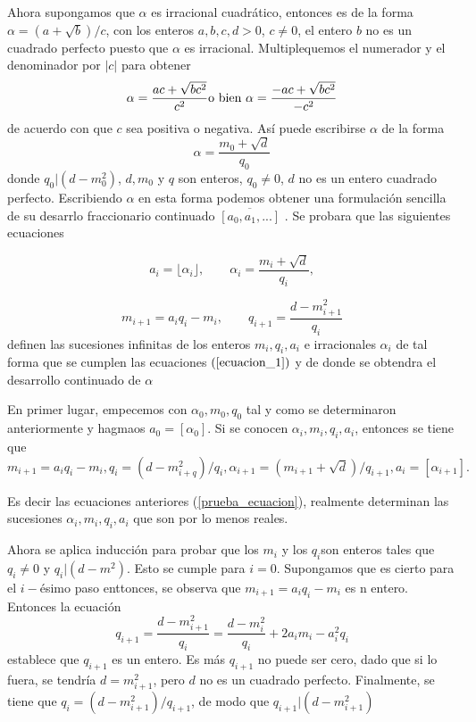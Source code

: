 \documentclass[11pt, article]{article}
\begin{document}
    Ahora supongamos que $\alpha$ es irracional cuadrático, entonces es de la forma $\alpha=(a+\sqrt{b})/c$, con los enteros $a,b,c,d>0$, $c\not=0$, el entero $b$ no es un cuadrado perfecto puesto que $\alpha$ es irracional. Multiplequemos el numerador y el denominador por $|c|$ para obtener 
        \[
        \alpha = \dfrac{ac + \sqrt{bc^2}}{c^2} \textnormal{o bien } \alpha=\dfrac{-ac+\sqrt{bc^2}}{-c^2}
        \]
    de acuerdo con que $c$ sea positiva o negativa. Así puede escribirse $\alpha$ de la forma
        \[
        \alpha = \dfrac{m_0+\sqrt{d}}{q_0}
        \]
    donde $q_0|(d-m_0^2)$, $d,m_0$ y $q$ son enteros, $q_0\not=0$, $d$ no es un entero cuadrado perfecto. Escribiendo $\alpha$ en esta forma podemos obtener una formulación sencilla de su desarrlo fraccionario continuado $\overline{[a_0,a_1,...]}$ . Se probara que las siguientes ecuaciones 

        \begin{equation}
        a_i= \lfloor \alpha_i \rfloor, \qquad \alpha_i=\dfrac{m_i+\sqrt{d}}{q_i}, \label{prueba_ecuacion}
        \end{equation}
        
        \[
        m_{i+1}=a_iq_i-m_i, \qquad q_{i+1}=\dfrac{d-m_{i+1}^2}{q_i}
        \] 
    definen las sucesiones infinitas de los enteros $m_i,q_i,a_i$ e irracionales $\alpha_i$ de tal forma que se cumplen las ecuaciones $(\ref{ecuacion_1})$ y de donde se obtendra el desarrollo continuado de $\alpha$

    En primer lugar, empecemos con $\alpha_0,m_0,q_0$ tal y como se determinaron anteriormente  y hagmaos $a_0=[\alpha_0]$. Si se conocen $\alpha_i,m_i,q_i,a_i$, entonces se tiene que 
        \[
         m_{i+1}=a_iq_i - m_i, q_i=(d-m_{i+q}^2)/q_i, \alpha_{i+1}=(m_{i+1} + \sqrt{d})/q_{i+1}, a_i=[\alpha_{i+1}].
         \]
    
    Es decir las ecuaciones anteriores (\ref{prueba_ecuacion}), realmente determinan las sucesiones $\alpha_i,m_i,q_i,a_i$ que son por lo menos reales.
    
    Ahora se aplica inducción para probar que los $m_i$ y los $q_i$son enteros tales que $q_i\not=0$ y $q_i|(d-m^2)$. Esto se cumple para $i=0$. Supongamos que es cierto para el $i-$ésimo paso enttonces, se observa que $m_{i+1}=a_iq_i-m_i$ es n entero. Entonces la ecuación 
         \[
        q_{i+1}=\dfrac{d-m_{i+1}^2}{q_i}=\dfrac{d-m_i^2}{q_i} + 2a_im_i-a_i^2q_i
        \]
    establece que $q_{i+1}$ es un entero. Es más $q_{i+1}$ no puede ser cero, dado que si lo fuera, se tendría $d=m^2_{i+1}$, pero $d$ no es un cuadrado perfecto. Finalmente, se tiene que $q_i=(d-m_{i+1}^2)/q_{i+1}$, de modo que $q_{i+1}|(d-m_{i+1}^2)$
    
\end{document}
